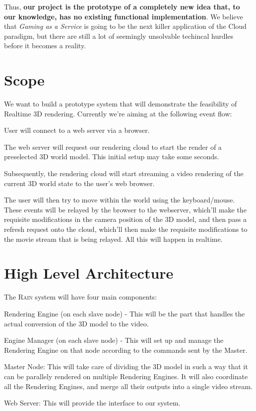 \documentclass[10pt]{article}
\newenvironment{my_itemize}
{\begin{itemize}
  \setlength{\itemsep}{0pt}
  \setlength{\parskip}{0pt}
  \setlength{\parsep}{0pt}}
{\end{itemize}}
\begin{document}
Thus, \textbf{our project is the prototype of a completely new idea that, to our knowledge, has no existing functional implementation}. We believe that \emph{Gaming as a Service} is going to be the next killer application of the Cloud paradigm, but there are still a lot of seemingly unsolvable techincal hurdles before it becomes a reality.


\section{Scope}
We want to build a prototype system that will demonstrate the feasibility of Realtime 3D rendering. Currently we're aiming at the following event flow:
\begin{my_itemize}
\item User will connect to a web server via a browser. 
\item The web server will request our rendering cloud to start the render of a preselected 3D world model. This initial setup may take some seconds.
\item Subsequently, the rendering cloud will start streaming a video rendering of the current 3D world state to the user's web browser.
\item The user will then try to move within the world using the keyboard/mouse. These events will be relayed by the browser to the webserver, which'll make the requisite modifications in the camera position of the 3D model, and then pass a refresh request onto the cloud, which'll then make the requisite modifications to the movie stream that is being relayed. All this will happen in realtime.
\end{my_itemize}

\section{High Level Architecture}
The \textsc{Rain} system will have four main components:
\begin{my_itemize}
\item Rendering Engine (on each slave node) - This will be the part that handles the actual conversion of the 3D model to the video.
\item Engine Manager (on each slave node) - This will set up and manage the Rendering Engine on that node according to the commands sent by the Master.
\item Master Node: This will take care of dividing the 3D model in such a way that it can be parallely rendered on multiple Rendering Engines. It will also coordinate all the Rendering Engines, and merge all their outputs into a single video stream.
\item Web Server: This will provide the interface to our system.
\end{my_itemize}
\end{document}
